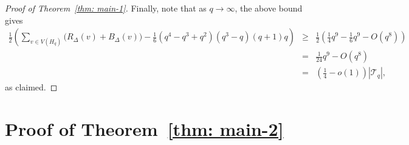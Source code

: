 \documentclass[A4paper,reqno,oneside,12pt]{amsart}
\theoremstyle{plain}
\newenvironment{manualtheorem}[1]{%
  \IfBlankTF{#1}
    {\renewcommand{\themanualtheoreminner}{\unskip}}
    {\renewcommand\themanualtheoreminner{#1}}%
  \manualtheoreminner
}{\endmanualtheoreminner}
\theoremstyle{definition}
\newcommand{\scT}{\mathscr{T}}
\begin{document}
\begin{proof}[Proof of Theorem~\ref{thm: main-1}]
Finally, note that as $q \to \infty$, the above bound gives
\begin{eqnarray*}
    \frac{1}{2} \left( \sum_{v \in V(H_q)} {\Big (} R_\Delta(v) + B_\Delta(v) {\Big )} - \frac{1}{6} (q^4-q^3+q^2)(q^3-q)(q+1)q \right)
    &\geq& \frac{1}{2} \left( \frac{1}{4}q^9 - \frac{1}{6}q^9 - O(q^8) \right)\\
    &=& \frac{1}{24}q^9 - O(q^8)\\
    &=& \left( \frac{1}{4} - o(1) \right)|\scT_q|,
\end{eqnarray*}
as claimed.
\end{proof}



\section{Proof of Theorem~\ref{thm: main-2}}
\label{section: proof of Thm 2}


\end{document}
